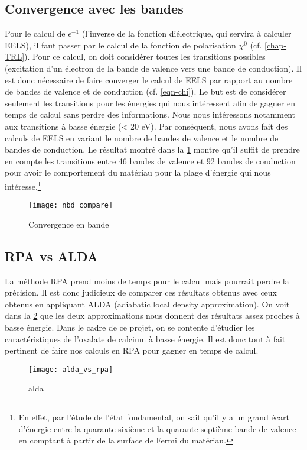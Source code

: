 \subsection{Convergence avec les bandes}
Pour le calcul de $\epsilon^{-1}$ (l'inverse de la fonction diélectrique, qui servira à calculer EELS),
il faut passer par le calcul de la fonction de polarisation $\chi^0$ (cf. \cref{chap-TRL}).
Pour ce calcul, on doit considérer toutes les transitions possibles
(excitation d'un électron de la bande de valence vers une bande de conduction).
Il est donc nécessaire de faire converger le calcul de EELS par rapport au nombre de bandes de valence
et de conduction (cf. \cref{eqn-chi}).
Le but est de considérer seulement les transitions pour les énergies qui nous intéressent
afin de gagner en temps de calcul sans perdre des informations.
Nous nous intéressons notamment aux transitions à basse énergie (< 20 eV).
Par conséquent, nous avons fait des calculs de EELS en variant le nombre de bandes de valence et le nombre de bandes de conduction.
Le résultat montré dans la \cref{fig-cv_nbd} montre qu'il suffit de prendre en compte
les transitions entre 46 bandes de valence et 92 bandes de conduction pour avoir le comportement du matériau pour la plage d'énergie qui nous intéresse.\footnote{
En effet, par l'étude de l'état fondamental, on sait qu'il y a un grand écart d'énergie entre la quarante-sixième et la quarante-septième bande de valence en comptant à partir de la surface de Fermi du matériau.}
\begin{figure}[!h]
    \centering
    \texttt{[image: nbd\_compare]}
    \caption{Convergence en bande}\label{fig-cv_nbd}
\end{figure}

\subsection{RPA vs ALDA}
La méthode RPA prend moins de temps
pour le calcul mais pourrait perdre la précision.
Il est donc judicieux de comparer ces résultats obtenus avec ceux obtenus
en appliquant ALDA (adiabatic local density approximation).
On voit dans la \cref{fig-alda_vs_rpa} que
les deux approximations nous donnent des résultats assez proches à basse énergie.
Dans le cadre de ce projet, on se contente d'étudier les caractéristiques
de l'oxalate de calcium à basse énergie.
Il est donc tout à fait pertinent de faire nos calculs en RPA pour gagner en temps de calcul.
\begin{figure}[!h]
    \centering
    \texttt{[image: alda\_vs\_rpa]}
    \caption{alda}\label{fig-alda_vs_rpa}
\end{figure}
\clearpage

